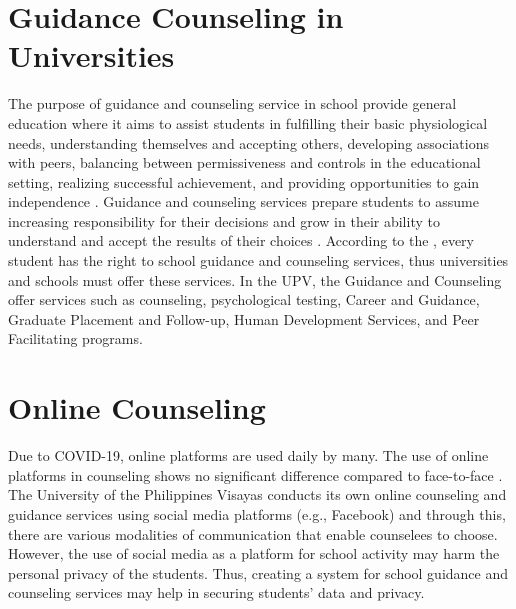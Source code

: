 \section{Guidance Counseling in Universities}
The purpose of guidance and counseling service in school provide general education where it aims to assist students in fulfilling their basic physiological needs, understanding themselves and accepting others, developing associations with peers, balancing between permissiveness and controls in the educational setting, realizing successful achievement, and providing opportunities to gain independence \cite{heyden2011counseling}. Guidance and counseling services prepare students to assume increasing responsibility for their decisions and grow in their ability to understand and accept the results of their choices . According to the , every student has the right to school guidance and counseling services, thus universities and schools must offer these services. In the UPV, the Guidance and Counseling offer services such as counseling, psychological testing, Career and Guidance, Graduate Placement and Follow-up, Human Development Services, and Peer Facilitating programs. 

\section{Online Counseling}
Due to COVID-19, online platforms are used daily by many. The use of online platforms in counseling shows no significant difference compared to face-to-face \cite{zeren2020effectiveness}. The University of the Philippines Visayas conducts its own online counseling and guidance services using social media platforms (e.g., Facebook) and through this, there are various modalities of communication that enable counselees to choose. However, the use of social media as a platform for school activity may harm the personal privacy of the students. Thus, creating a system for school guidance and counseling services may help in securing students’ data and privacy. 


